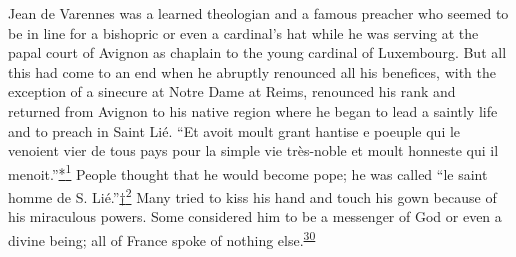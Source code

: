 Jean de Varennes was a learned theologian and a famous preacher who
seemed to be in line for a bishopric or even a cardinal's hat while he
was serving at the papal court of Avignon as chaplain to the young
cardinal of Luxembourg. But all this had come to an end when he abruptly
renounced all his benefices, with the exception of a sinecure at Notre
Dame at Reims, renounced his rank and returned from Avignon to his
native region where he began to lead a saintly life and to preach in
Saint Lié. ``Et avoit moult grant hantise e poeuple qui le venoient vier
de tous pays pour la simple vie très-noble et moult honneste qui il
\protect\hypertarget{15_Chapter_Eight__RELIGIOUS_EXCITAT.xhtmlux5cux23page_227}{}{}menoit.''\protect\hypertarget{15_Chapter_Eight__RELIGIOUS_EXCITAT.xhtmlux5cux23id_2563}{\protect\hyperlink{23_NOTES.xhtmlux5cux23id_2564}{*\textsuperscript{1}}}
People thought that he would become pope; he was called ``le saint homme
de S.
Lié.''\protect\hypertarget{15_Chapter_Eight__RELIGIOUS_EXCITAT.xhtmlux5cux23id_2565}{\protect\hyperlink{23_NOTES.xhtmlux5cux23id_2566}{†\textsuperscript{2}}}
Many tried to kiss his hand and touch his gown because of his miraculous
powers. Some considered him to be a messenger of God or even a divine
being; all of France spoke of nothing
else.\textsuperscript{\protect\hypertarget{15_Chapter_Eight__RELIGIOUS_EXCITAT.xhtmlux5cux23id_847}{\protect\hyperlink{23_NOTES.xhtmlux5cux23id_848}{30}}}

